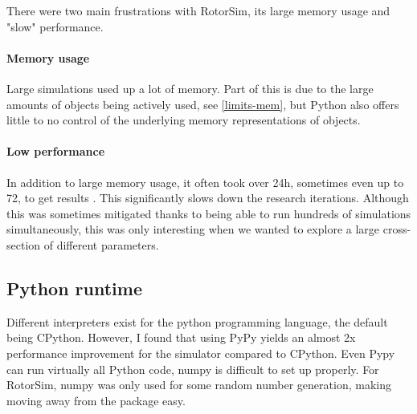 There were two main frustrations  with RotorSim, its large memory usage and "slow" performance.

\paragraph{Memory usage} \label{rotorsim-mem}
Large simulations used up a lot of memory. 
Part of this is due to the large amounts of objects being actively used, see \ref{limits-mem}, but Python also offers little to no control of the underlying memory representations of objects. 

\paragraph{Low performance} \label{rotorsim-perf}
In addition to large memory usage, it often took over 24h, sometimes even up to 72, to get results .
This significantly slows down the research iterations.
Although this was sometimes mitigated thanks to being able to run hundreds of simulations simultaneously, this was only interesting when we wanted to explore a large cross-section of different parameters.



\subsection{Python runtime} \label{rotorsim-runtime}

Different interpreters exist for the python programming language, the default being CPython.
However, I found that using PyPy \cite{team_pypy_2019} yields an almost 2x performance improvement for the simulator compared to CPython.
Even Pypy can run virtually all Python code, numpy \cite{van_der_walt_numpy_2011} is difficult to set up properly.
For RotorSim, numpy was only used for some random number generation, making moving away from the package easy.








